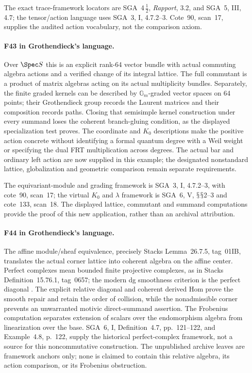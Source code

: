 \documentclass[11pt,a4paper]{article}
\renewcommand{\S}{\ensuremath{\mathsection}}
\newcommand{\fid}[1]{\textsf{#1}}\newcommand{\gate}[1]{\textsf{#1}}
\theoremstyle{named}\newtheorem{finding}{Finding}[section]
\theoremstyle{definition}\newtheorem{definition}[finding]{Definition}
\theoremstyle{remark}\newtheorem{remark}[finding]{Remark}
\begin{document}
The exact trace-framework locators are SGA~4\,$\frac12$, \emph{Rapport}, 3.2, and SGA~5, III, 4.7; the tensor/action language uses SGA~3, I, 4.7.2--3. Cote~90, scan~17, supplies the audited action vocabulary, not the comparison axiom.


\paragraph{\fid{F43} in Grothendieck's language.}
Over $\Spec S$ this is an explicit rank-64 vector bundle with
actual commuting algebra actions and a verified change of its
integral lattice. The full commutant is a product of matrix
algebras acting on its actual multiplicity bundles.
Separately, the finite graded kernels can be described by
$\mathbb G_m$-graded vector spaces on 64 points; their
Grothendieck group records the Laurent matrices and their
composition records paths. Closing that semisimple kernel
construction under every summand loses the coherent branch-gluing
condition, as the displayed specialization test proves.
The coordinate and $K_0$ descriptions make the positive action
concrete without identifying a formal quantum degree with a Weil
weight or specifying the dual FRT multiplication across degrees.
The actual bar and ordinary left action are now supplied in this
example; the designated nonstandard lattice, globalization and
geometric comparison remain separate requirements.

The equivariant-module and grading framework is SGA~3, I,
4.7.2--3, with cote~90, scan~17; the virtual $K_0$ and $\lambda$
framework is SGA~6, V, \S\S2--3 and cote~133, scan~18.
The displayed lattice, commutant and summand computations provide
the proof of this new application, rather than an archival attribution.


\paragraph{\fid{F44} in Grothendieck's language.}
The affine module/sheaf equivalence, precisely
Stacks Lemma~26.7.5, tag~01IB, translates the actual
corner lattice into coherent algebra on the affine
center. Perfect complexes mean bounded finite
projective complexes, as in Stacks Definition~15.76.1,
tag~0657; the modern dg smoothness criterion is
the perfect diagonal
\cite[\S5.1, pp.~13--14]{TabuadaWeil}.
The explicit relative diagonal and coherent derived
Hom prove the smooth repair and retain the order of
collision, while the nonadmissible corner prevents
an unwarranted motivic direct-summand assertion.
The Frobenius computation separates extension of
scalars over the endomorphism algebra from
linearization over the base. SGA~6, I, Definition~4.7, pp.~121--122, and
Example~4.8, p.~122, supply the historical perfect-complex framework, not a
source for this noncommutative construction.
The unpublished archive leaves are framework
anchors only; none is claimed to contain this
relative algebra, its action comparison, or its
Frobenius obstruction.
\end{document}
